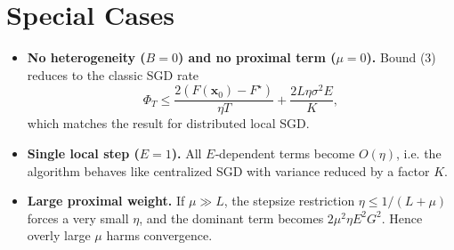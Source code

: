 \documentclass{article}
\begin{document}
\section*{Special Cases}
\begin{itemize}
\item \textbf{No heterogeneity ($B=0$) and no proximal term ($\mu=0$).}  
Bound (3) reduces to the classic SGD rate
\[
\Phi_T \le \frac{2(F(\mathbf{x}_0)-F^\star)}{\eta T}
          +\frac{2L\eta\sigma^2E}{K},
\]
which matches the result for distributed local SGD.
\item \textbf{Single local step ($E=1$).}  
All $E$‑dependent terms become $O(\eta)$, i.e. the algorithm behaves like
centralized SGD with variance reduced by a factor $K$.
\item \textbf{Large proximal weight.}  
If $\mu\gg L$, the stepsize restriction $\eta\le 1/(L+\mu)$ forces a very small $\eta$, and the dominant term becomes $2\mu^2\eta E^2 G^2$. Hence overly large $\mu$ harms convergence.
\end{itemize}
\end{document}
